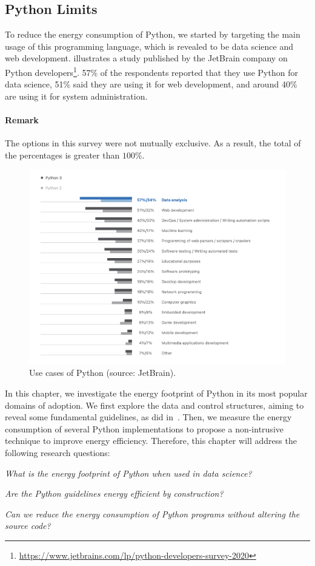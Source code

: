 \subsection{Python Limits}
To reduce the energy consumption of Python, we started by targeting the main usage of this programming language, which is revealed to be data science and web development.
 illustrates a study published by the JetBrain company on Python developers\footnote{\url{https://www.jetbrains.com/lp/python-developers-survey-2020}}.
57\% of the respondents reported that they use Python for data science, 51\% said they are using it for web development, and around 40\% are using it for system administration.
\paragraph{Remark}
The options in this survey were not mutually exclusive. As a result, the total of the percentages is greater than $100\%$.


\begin{figure}[hbt]
    \centering
    \includegraphics[width=\linewidth]{imgs/python_use_cases}
    \caption{Use cases of Python (source: JetBrain).}
    \label{fig:usecase}
\end{figure}

In this chapter, we investigate the energy footprint of Python in its most popular domains of adoption.
We first explore the data and control structures, aiming to reveal some fundamental guidelines, as \citeauthor{hasan_energy_2016} did in~\cite{hasan_energy_2016}.
Then, we measure the energy consumption of several Python implementations to propose a non-intrusive technique to improve energy efficiency.
Therefore, this chapter will address the following research questions:
\begin{compactenum}[\indent\bf RQ\,1:]
    \item \emph{What is the energy footprint of Python when used in data science?}
    \item \emph{Are the Python guidelines energy efficient by construction?}
    \item \emph{Can we reduce the energy consumption of Python programs without altering the source code?}
\end{compactenum}

